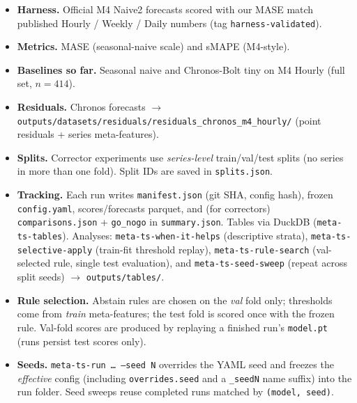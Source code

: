 \begin{itemize}
  \item \textbf{Harness.} Official M4 Naive2 forecasts scored with our MASE match
        published Hourly / Weekly / Daily numbers (tag \texttt{harness-validated}).
  \item \textbf{Metrics.} MASE (seasonal-naive scale) and sMAPE (M4-style).
  \item \textbf{Baselines so far.} Seasonal naive and Chronos-Bolt tiny on M4
        Hourly (full set, $n=414$).
  \item \textbf{Residuals.} Chronos forecasts $\rightarrow$
        \texttt{outputs/datasets/residuals/residuals\_chronos\_m4\_hourly/}
        (point residuals + series meta-features).
  \item \textbf{Splits.} Corrector experiments use \emph{series-level}
        train/val/test splits (no series in more than one fold). Split IDs are
        saved in \texttt{splits.json}.
  \item \textbf{Tracking.} Each run writes \texttt{manifest.json} (git SHA,
        config hash), frozen \texttt{config.yaml}, scores/forecasts parquet,
        and (for correctors) \texttt{comparisons.json} + \texttt{go\_nogo} in
        \texttt{summary.json}. Tables via DuckDB (\texttt{meta-ts-tables}).
        Analyses: \texttt{meta-ts-when-it-helps} (descriptive strata),
        \texttt{meta-ts-selective-apply} (train-fit threshold replay),
        \texttt{meta-ts-rule-search} (val-selected rule, single test evaluation),
        and \texttt{meta-ts-seed-sweep} (repeat across split seeds)
        $\rightarrow$ \texttt{outputs/tables/}.
  \item \textbf{Rule selection.} Abstain rules are chosen on the \emph{val} fold
        only; thresholds come from \emph{train} meta-features; the test fold is
        scored once with the frozen rule. Val-fold scores are produced by
        replaying a finished run's \texttt{model.pt} (runs persist test scores only).
  \item \textbf{Seeds.} \texttt{meta-ts-run \ldots{} --seed N} overrides the YAML
        seed and freezes the \emph{effective} config (including
        \texttt{overrides.seed} and a \texttt{\_seedN} name suffix) into the run
        folder. Seed sweeps reuse completed runs matched by
        \texttt{(model, seed)}.
\end{itemize}
